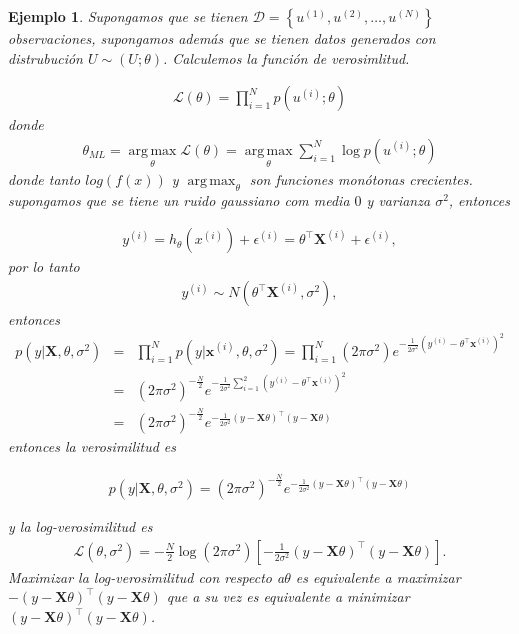 \documentclass[12pt]{article}
\newtheorem{Ejem}{Ejemplo}[section]
\begin{document}
\begin{Ejem}
Supongamos que se tienen $\mathcal{D}=\left\{u^{(1)},u^{(2)},\ldots,u^{(N)}\right\}$ observaciones, supongamos adem\'as que se tienen datos generados con distrubuci\'on $U\sim\left(U;\theta\right)$. Calculemos la funci\'on de verosimlitud.

\begin{eqnarray}
\mathcal{L}\left(\theta\right)=\prod_{i=1}^{N}p\left(u^{(i)};\theta\right)
\end{eqnarray}
donde
\begin{eqnarray}
\theta_{ML}=\operatorname*{arg\,max}_{\theta}\mathcal{L}\left(\theta\right)=\operatorname*{arg\,max}_{\theta}\sum_{i=1}^{N}\log p\left(u^{(i)};\theta\right)
\end{eqnarray}
donde tanto $log(f(x))$ y $\operatorname*{arg\,max}_{\theta}$ son funciones mon\'otonas crecientes. supongamos que se tiene un ruido gaussiano com media $0$ y varianza $\sigma^{2}$, entonces

\begin{eqnarray}
y^{(i)}=h_{\theta}\left(x^{(i)}\right)+\epsilon^{(i)}=\theta^{\top}\mathbf{X}^{(i)}+\epsilon^{(i)},
\end{eqnarray}
por lo tanto
\begin{eqnarray}
y^{(i)}\sim N\left(\theta^{\top}\mathbf{X}^{(i)},\sigma^{2}\right), 
\end{eqnarray}
entonces
\begin{eqnarray}
p\left(y|\mathbf{X},\theta,\sigma^{2}\right)&=&\prod_{i=1}^{N}p\left(y|\mathbf{x}^{(i)},\theta,\sigma^{2}\right)=\prod_{i=1}^{N}\left(2\pi\sigma^{2}\right)e^{-\frac{1}{2\sigma^{2}}\left(y^{(i)}-\theta^{\top}\mathbf{x}^{(i)}\right)^{2}}\\
&=&\left(2\pi\sigma^{2}\right)^{-\frac{N}{2}}e^{-\frac{1}{2\sigma^{2}}\sum_{i=1}^{2}\left(y^{(i)}-\theta^{\top}\mathbf{x}^{(i)}\right)^{2}}\\
&=&\left(2\pi\sigma^{2}\right)^{-\frac{N}{2}}e^{-\frac{1}{2\sigma^{2}}\left(y-\mathbf{X}\theta\right)^{\top}\left(y-\mathbf{X}\theta\right)}
\end{eqnarray}
entonces la verosimilitud es

\begin{eqnarray}
p\left(y|\mathbf{X},\theta,\sigma^{2}\right)=\left(2\pi\sigma^{2}\right)^{-\frac{N}{2}}e^{-\frac{1}{2\sigma^{2}}\left(y-\mathbf{X}\theta\right)^{\top}\left(y-\mathbf{X}\theta\right)}
\end{eqnarray}

y la log-verosimilitud es
\begin{eqnarray}
\mathcal{L}\left(\theta,\sigma^{2}\right)=-\frac{N}{2}\log\left(2\pi\sigma^{2}\right)\left[-\frac{1}{2\sigma^{2}}\left(y-\mathbf{X}\theta\right)^{\top}\left(y-\mathbf{X}\theta\right)\right].
\end{eqnarray}
Maximizar la log-verosimilitud con respecto a$\theta$ es equivalente a maximizar $-\left(y-\mathbf{X}\theta\right)^{\top}\left(y-\mathbf{X}\theta\right)$ que a su vez es equivalente a minimizar $\left(y-\mathbf{X}\theta\right)^{\top}\left(y-\mathbf{X}\theta\right)$.

\end{Ejem}
\end{document}
